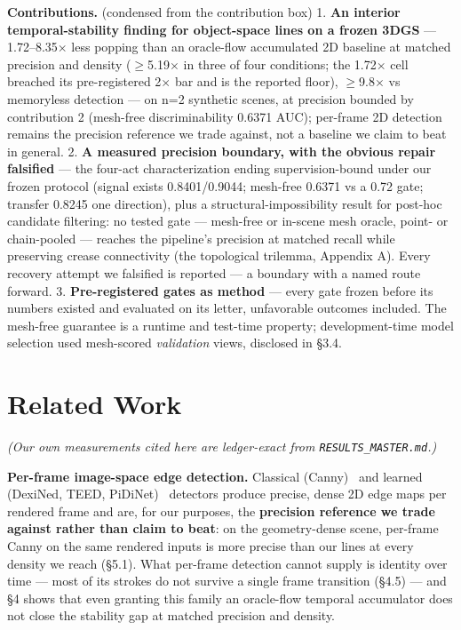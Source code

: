 \textbf{Contributions.} (condensed from the contribution box)
1. \textbf{An interior temporal-stability finding for object-space lines on a frozen 3DGS} ---
   1.72--8.35$\times$ less popping than an oracle-flow accumulated 2D baseline at matched
   precision and density ($\geq$5.19$\times$ in three of four conditions; the 1.72$\times$ cell breached its
   pre-registered 2$\times$ bar and is the reported floor), $\geq$9.8$\times$ vs memoryless detection --- on
   n=2 synthetic scenes, at precision bounded by contribution 2 (mesh-free
   discriminability 0.6371 AUC); per-frame 2D detection remains the precision reference we
   trade against, not a baseline we claim to beat in general.
2. \textbf{A measured precision boundary, with the obvious repair falsified} --- the four-act
   characterization ending supervision-bound under our frozen protocol (signal exists
   0.8401/0.9044; mesh-free 0.6371 vs a 0.72 gate; transfer 0.8245 one direction), plus a
   structural-impossibility result for post-hoc candidate filtering: no tested gate ---
   mesh-free or in-scene mesh oracle, point- or chain-pooled --- reaches the pipeline's
   precision at matched recall while preserving crease connectivity (the topological
   trilemma, Appendix A). Every recovery attempt we falsified is reported --- a boundary
   with a named route forward.
3. \textbf{Pre-registered gates as method} --- every gate frozen before its numbers existed and
   evaluated on its letter, unfavorable outcomes included. The mesh-free guarantee is a
   runtime and test-time property; development-time model selection used mesh-scored
   \emph{validation} views, disclosed in \S3.4.

\section{Related Work}
\emph{(Our own measurements cited here are ledger-exact from \texttt{RESULTS\_MASTER.md}.)}

\textbf{Per-frame image-space edge detection.} Classical (Canny)~\cite{canny1986} and learned (DexiNed, TEED,
PiDiNet)~\cite{dexined,teed,pidinet} detectors produce precise, dense 2D edge maps per rendered frame and are, for our
purposes, the \textbf{precision reference we trade against rather than claim to beat}: on the
geometry-dense scene, per-frame Canny on the same rendered inputs is more precise than our
lines at every density we reach (\S5.1). What per-frame detection cannot supply is
identity over time --- most of its strokes do not survive a single frame transition (\S4.5)
--- and \S4 shows that even granting this family an oracle-flow temporal accumulator does
not close the stability gap at matched precision and density.

